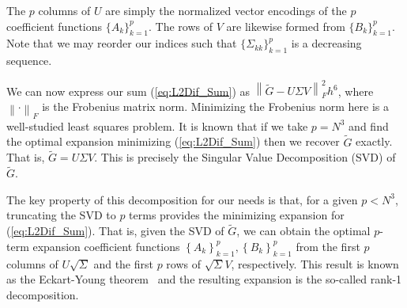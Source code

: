 \documentclass[preprint,12pt]{elsarticle}
\newcommand{\norm}[1]{\left\lVert#1\right\rVert}
\newcommand{\ti}[1]{\tilde{#1}}
\begin{document}
The $p$ columns of $U$ are simply the normalized vector encodings of the $p$ coefficient functions $\{A_k\}_{k=1}^p$. The rows of $V$ are likewise formed from $\{B_k\}_{k=1}^p$.
Note that we may reorder our indices such that $\{\Sigma_{kk}\}_{k=1}^p$ is a decreasing sequence.

We can now express our sum (\ref{eq:L2Dif_Sum}) as $\norm{\ti{G}-U\Sigma V}_F^2h^6$, where $\norm{\cdot}_F$ is the Frobenius matrix norm. Minimizing the Frobenius norm here is a well-studied least squares problem. It is known that if we take $p=N^3$ and find the optimal expansion minimizing (\ref{eq:L2Dif_Sum}) then we recover $\ti{G}$ exactly. That is, $\ti{G} = U\Sigma V$. This is precisely the Singular Value Decomposition (SVD) of $\ti{G}$.

The key property of this decomposition for our needs is that, for a given $p<N^3$, truncating the SVD to $p$ terms provides the minimizing expansion for (\ref{eq:L2Dif_Sum}). That is, given the SVD of $\ti{G}$,
we can obtain the optimal $p$-term expansion coefficient functions $\left\{A_k\right\}_{k=1}^p, \left\{B_k\right\}_{k=1}^p$ from the first $p$ columns of $U\sqrt{\Sigma}$ and the first $p$ rows of $\sqrt{\Sigma}V$, respectively. This result is known as the Eckart-Young theorem~\cite{EckartYoung} and the resulting expansion is the so-called rank-1 decomposition.
\end{document}
